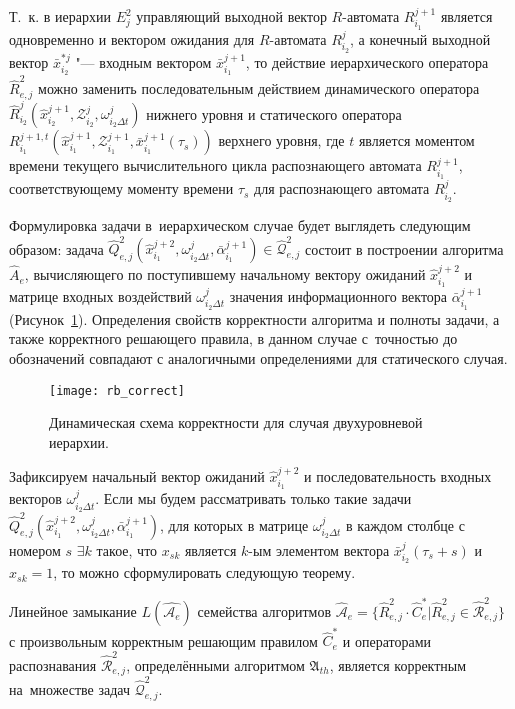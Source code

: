 Т.~к. в иерархии $E_j^2$ управляющий выходной вектор $R$-автомата $R_{i_1}^{j+1}$ является одновременно и вектором ожидания для $R$-автомата $R_{i_2}^j$, а конечный выходной вектор $\bar x_{i_2}^{*j}$ "--- входным вектором $\bar x_{i_1}^{j+1}$, то действие иерархического оператора $\hat R_{e,j}^2$ можно заменить последовательным действием динамического оператора $\hat R_{i_2}^j(\hat x _{i_2}^{j+1},\mathcal Z_{i_2}^j,\omega_{i_2\Delta t}^j)$ нижнего уровня и статического оператора $R_{i_1}^{j+1,t}(\hat x _{i_1}^{j+1},\mathcal Z_{i_1}^{j+1},\bar x_{i_1}^{j+1}(\tau_s))$ верхнего уровня, где $t$ является моментом времени текущего вычислительного цикла распознающего автомата $R_{i_1}^{j+1}$, соответствующему моменту времени $\tau_s$ для распознающего автомата $R_{i_2}^j$.

Формулировка задачи в~иерархическом случае будет выглядеть следующим образом: задача $\hat Q_{e,j}^2(\hat x_{i_1}^{j+2},\omega_{i_2\Delta t}^j,\bar\alpha_{i_1}^{j+1})\in\hat{\mathcal Q}_{e,j}^2$ состоит в построении алгоритма $\hat A_e$, вычисляющего по поступившему начальному вектору ожиданий $\hat x_{i_1}^{j+2}$ и матрице входных воздействий $\omega_{i_2\Delta t}^j$ значения информационного вектора $\bar\alpha_{i_1}^{j+1}$ (Рисунок~\ref{fig:rb_correct_hier}). Определения свойств корректности алгоритма и полноты задачи, а также корректного решающего правила, в данном случае с~точностью до обозначений совпадают с аналогичными определениями для статического случая.

\begin{figure}[h]
	\centering
	\texttt{[image: rb\_correct]}
	\caption{Динамическая схема корректности для случая двухуровневой иерархии.}
	\label{fig:rb_correct_hier}
\end{figure}

Зафиксируем начальный вектор ожиданий $\hat x_{i_1}^{j+2}$ и последовательность входных векторов $\omega_{i_2\Delta{t}}^j$. Если мы будем рассматривать только такие задачи $\hat Q_{e,j}^2(\hat x_{i_1}^{j+2},\omega_{i_2\Delta{t}}^j,\bar\alpha_{i_1}^{j+1})$, для которых в матрице $\omega_{i_2\Delta{t}}^j$ в каждом столбце с номером $s$ ${\exists}k$ такое, что $x_{sk}$ является $k$-ым элементом вектора $\bar x_{i_2}^j(\tau_s+s)$ и $x_{sk}=1$, то можно сформулировать следующую теорему.
		
\begin{Theorem}
	Линейное замыкание $L(\hat{\mathcal A_e})$ семейства алгоритмов $\hat{\mathcal A}_e=\{\hat R_{e,j}^2\cdot\hat C_e^*|\hat R_{e,j}^2\in\hat{\mathcal R}_{e,j}^2\}$ с произвольным корректным решающим правилом $\hat C_e^*$ и операторами распознавания $\hat{\mathcal R}_{e,j}^2$, определёнными алгоритмом $\mathfrak A_{th}$, является корректным на~множестве задач $\hat{\mathcal Q}_{e,j}^2$.
\end{Theorem}

